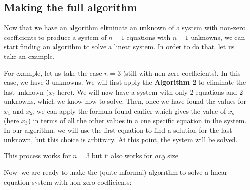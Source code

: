 \documentclass[11pt]{article}
\begin{document}
\subsection{Making the full algorithm}

Now that we have an algorithm eliminate an unknown of a system with non-zero coefficients to produce a system of $n - 1$ equations with $n - 1$ unknowns,
we can start finding an algorithm to solve a linear system.
In order to do that, let us take an example.

For example, let us take the case $n = 3$ (still with non-zero coefficients).
In this case, we have 3 unknowns.
We will first apply the \textbf{Algorithm 2} to eliminate the last unknown ($x_3$ here).
We will now have a system with only 2 equations and 2 unknowns, which we know how to solve.
Then, once we have found the values for $x_1$ and $x_2$, we can apply the formula found earlier which gives the value of $x_n$ (here $x_3$) in terms of all the other values in a one specific equation in the system.
In our algorithm, we will use the first equation to find a solution for the last unknown, but this choice is arbitrary.
At this point, the system will be solved.

This process works for $n = 3$ but it also works for \textit{any} size.

Now, we are ready to make the (quite informal) algorithm to solve a linear equation system with non-zero coefficients:

\begin{algorithm}
\caption{An algorithm to find the solutions of a linear system of equations with non-zero coefficients}
\end{algorithm}
\end{document}
